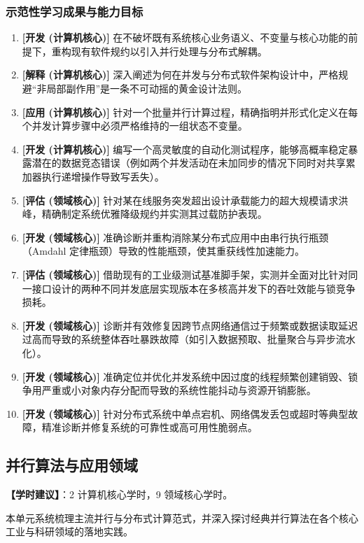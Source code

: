 \subsubsection{示范性学习成果与能力目标}
\begin{enumerate}
    \item \textbf{[开发 (计算机核心)]} 在不破坏既有系统核心业务语义、不变量与核心功能的前提下，重构现有软件规约以引入并行处理与分布式解耦。
    \item \textbf{[解释 (计算机核心)]} 深入阐述为何在并发与分布式软件架构设计中，严格规避“非局部副作用”是一条不可动摇的黄金设计法则。
    \item \textbf{[应用 (计算机核心)]} 针对一个批量并行计算过程，精确指明并形式化定义在每个并发计算步骤中必须严格维持的一组状态不变量。
    \item \textbf{[开发 (计算机核心)]} 编写一个高灵敏度的自动化测试程序，能够高概率稳定暴露潜在的数据竞态错误（例如两个并发活动在未加同步的情况下同时对共享累加器执行递增操作导致写丢失）。
    \item \textbf{[评估 (领域核心)]} 针对某在线服务突发超出设计承载能力的超大规模请求洪峰，精确制定系统优雅降级规约并实测其过载防护表现。
    \item \textbf{[开发 (领域核心)]} 准确诊断并重构消除某分布式应用中由串行执行瓶颈（Amdahl 定律瓶颈）导致的性能瓶颈，使其重获线性加速能力。
    \item \textbf{[评估 (领域核心)]} 借助现有的工业级测试基准脚手架，实测并全面对比针对同一接口设计的两种不同并发底层实现版本在多核高并发下的吞吐效能与锁竞争损耗。
    \item \textbf{[开发 (领域核心)]} 诊断并有效修复因跨节点网络通信过于频繁或数据读取延迟过高而导致的系统整体吞吐暴跌故障（如引入数据预取、批量聚合与异步流水化）。
    \item \textbf{[开发 (领域核心)]} 准确定位并优化并发系统中因过度的线程频繁创建销毁、锁争用严重或小对象内存分配而导致的系统性能抖动与资源开销膨胀。
    \item \textbf{[开发 (领域核心)]} 针对分布式系统中单点宕机、网络偶发丢包或超时等典型故障，精准诊断并修复系统的可靠性或高可用性脆弱点。
\end{enumerate}

\subsection{并行算法与应用领域}
\textbf{【学时建议】}：2 计算机核心学时，9 领域核心学时。

本单元系统梳理主流并行与分布式计算范式，并深入探讨经典并行算法在各个核心工业与科研领域的落地实践。

